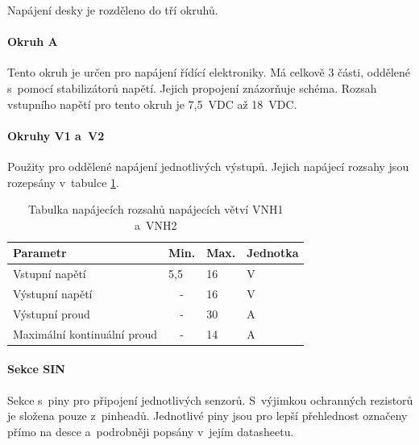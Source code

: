 Napájení desky je rozděleno do tří okruhů. 

\paragraph{Okruh A}
\label{par:PowerCircuitA}
Tento okruh je určen pro napájení řídící elektroniky.
Má celkově 3 části, oddělené s~pomocí stabilizátorů napětí.
Jejich propojení znázorňuje schéma.
Rozsah vstupního napětí pro tento okruh je 7,5~VDC až 18~VDC.

\paragraph{Okruhy V1 a~V2}
Použity pro oddělené napájení jednotlivých výstupů. 
Jejich napájecí rozsahy jsou rozepsány v~tabulce \ref{fig:powerSourceCharsVNH}.

\begin{table}[h]
    \centering
    \begin{tabular}{llll}
        \hline
        \multicolumn{1}{|l|}{\textbf{Parametr}}           & \multicolumn{1}{l|}{\textbf{Min.}} & \multicolumn{1}{l|}{\textbf{Max.}} & \multicolumn{1}{l|}{\textbf{Jednotka}} \\ \hline
        \multicolumn{1}{|l|}{Vstupní napětí}              & \multicolumn{1}{l|}{5,5}           & \multicolumn{1}{l|}{16}            & \multicolumn{1}{l|}{V}                 \\ \hline
        \multicolumn{1}{|l|}{Výstupní napětí}             & \multicolumn{1}{c|}{-}             & \multicolumn{1}{l|}{16}            & \multicolumn{1}{l|}{V}                 \\ \hline
        \multicolumn{1}{|l|}{Výstupní proud}              & \multicolumn{1}{c|}{-}             & \multicolumn{1}{l|}{30}            & \multicolumn{1}{l|}{A}                 \\ \hline
        \multicolumn{1}{|l|}{Maximální kontinuální proud} & \multicolumn{1}{c|}{-}             & \multicolumn{1}{l|}{14}            & \multicolumn{1}{l|}{A}                 \\ \hline
    \end{tabular}
    \caption{Tabulka napájecích rozsahů napájecích větví VNH1 a~VNH2}
    \label{fig:powerSourceCharsVNH}
\end{table}

\paragraph{Sekce SIN}
Sekce s~piny pro připojení jednotlivých senzorů. 
S~výjimkou ochranných rezistorů je složena pouze z~pinheadů.
Jednotlivé piny jsou pro lepší přehlednost označeny přímo na desce a~podrobněji popsány v~jejím datasheetu. 

